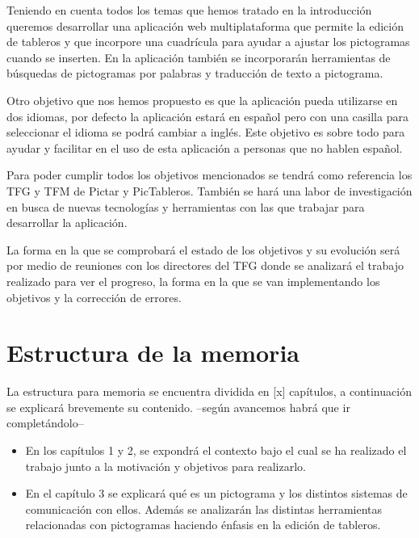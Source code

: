 Teniendo en cuenta todos los temas que hemos tratado en la introducción queremos desarrollar una aplicación web multiplataforma que permite la edición de tableros y que incorpore una cuadrícula para ayudar a ajustar los pictogramas cuando se inserten. En la aplicación también se incorporarán herramientas de búsquedas de pictogramas por palabras y traducción de texto a pictograma.

Otro objetivo que nos hemos propuesto es que la aplicación pueda utilizarse en dos idiomas, por defecto la aplicación estará en español pero con una casilla para seleccionar el idioma se podrá cambiar a inglés. Este objetivo es sobre todo para ayudar y facilitar en el uso de esta aplicación a personas que no hablen español.

Para poder cumplir todos los objetivos mencionados se tendrá como referencia los TFG y TFM de Pictar y PicTableros. También se hará una labor de investigación en busca de nuevas tecnologías y herramientas con las que trabajar para desarrollar la aplicación. 

La forma en la que se comprobará el estado de los objetivos y su evolución será por medio de reuniones con los directores del TFG donde se analizará el trabajo realizado para ver el progreso, la forma en la que se van implementando los objetivos y la corrección de errores.



\section{Estructura de la memoria}
\label{cap1:sec:Estructura}

La estructura para memoria se encuentra dividida en [x] capítulos, a continuación se explicará brevemente su contenido. --según avancemos habrá que ir completándolo--
\begin{itemize}
	\item En los capítulos 1 y 2, se expondrá el contexto bajo el cual se ha realizado el trabajo junto a la motivación y objetivos para realizarlo.
	\item En el capítulo 3 se explicará qué es un pictograma y los distintos sistemas de comunicación con ellos. Además se analizarán las distintas herramientas relacionadas con pictogramas haciendo énfasis en la edición de tableros.
\end{itemize}	





